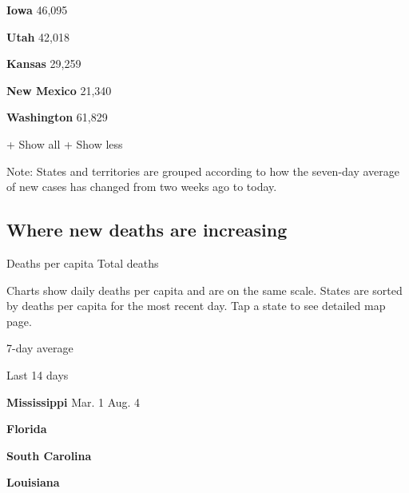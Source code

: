 \textbf{Iowa} 46,095

\href{https://www.nytimes.com/interactive/2020/us/utah-coronavirus-cases.html}{}

\textbf{Utah} 42,018

\href{https://www.nytimes.com/interactive/2020/us/kansas-coronavirus-cases.html}{}

\textbf{Kansas} 29,259

\href{https://www.nytimes.com/interactive/2020/us/new-mexico-coronavirus-cases.html}{}

\textbf{New Mexico} 21,340

\href{https://www.nytimes.com/interactive/2020/us/washington-coronavirus-cases.html}{}

\textbf{Washington} 61,829

+ Show all + Show less

Note: States and territories are grouped according to how the seven-day
average of new cases has changed from two weeks ago to today.

\hypertarget{where-new-deaths-are-increasing}{%
\subsection{Where new deaths are
increasing}\label{where-new-deaths-are-increasing}}

Deaths per capita Total deaths

Charts show daily deaths per capita and are on the same scale. States
are sorted by deaths per capita for the most recent day. Tap a state to
see detailed map page.

\href{https://www.nytimes.com/interactive/2020/us/mississippi-coronavirus-cases.html}{}

7-day average

Last 14 days

\textbf{Mississippi} Mar. 1 Aug. 4

\href{https://www.nytimes.com/interactive/2020/us/florida-coronavirus-cases.html}{}

\textbf{Florida}

\href{https://www.nytimes.com/interactive/2020/us/south-carolina-coronavirus-cases.html}{}

\textbf{South Carolina}

\href{https://www.nytimes.com/interactive/2020/us/louisiana-coronavirus-cases.html}{}

\textbf{Louisiana}

\href{https://www.nytimes.com/interactive/2020/us/texas-coronavirus-cases.html}{}

